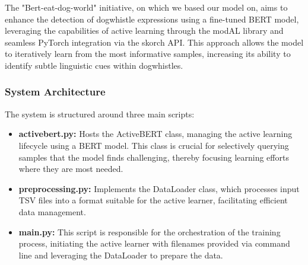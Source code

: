 \documentclass[11pt,a4paper]{article}
\begin{document}
The "Bert-eat-dog-world" initiative, on which we based our model on, aims to enhance the detection of dogwhistle expressions using a fine-tuned BERT model, leveraging the capabilities of active learning through the modAL library and seamless PyTorch integration via the skorch API. This approach allows the model to iteratively learn from the most informative samples, increasing its ability to identify subtle linguistic cues within dogwhistles. 

\subsubsection{System Architecture}
The system is structured around three main scripts: 
\begin{itemize}
    \item \textbf{activebert.py:} Hosts the ActiveBERT class, managing the active learning lifecycle using a BERT model. This class is crucial for selectively querying samples that the model finds challenging, thereby focusing learning efforts where they are most needed.
    \item \textbf{preprocessing.py:} Implements the DataLoader class, which processes input TSV files into a format suitable for the active learner, facilitating efficient data management.
    \item \textbf{main.py:} This script is responsible for the orchestration of the training process, initiating the active learner with filenames provided via command line and leveraging the DataLoader to prepare the data.
\end{itemize}
\end{document}
